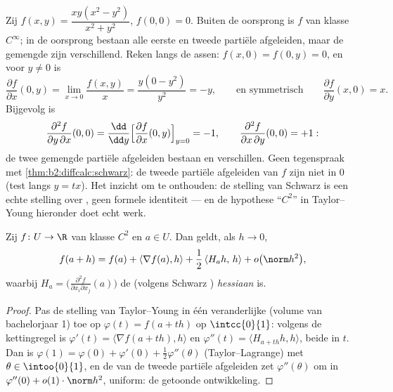 \begin{example}\label{ex:b2:diffcalc:peano}
Zij $f(x, y) = \dfrac{xy(x^2 - y^2)}{x^2 + y^2}$, $f(0,0) = 0$.
Buiten de oorsprong is $f$ van klasse $C^\infty$; in de oorsprong
bestaan alle eerste en tweede partiële afgeleiden, maar de gemengde
zijn verschillend. Reken langs de assen: $f(x, 0) = f(0, y) = 0$,
en voor $y \neq 0$ is
\[
\frac{\partial f}{\partial x}(0, y)
= \lim_{x\to0}\frac{f(x,y)}{x}
= \frac{y(0 - y^2)}{y^2} = -y ,
\qquad\text{en symmetrisch}\qquad
\frac{\partial f}{\partial y}(x, 0) = x .
\]
Bijgevolg is
\[
\frac{\partial^2 f}{\partial y\,\partial x}(0,0)
= \frac{\dd}{\dd y}\Bigl[\frac{\partial f}{\partial
x}(0,y)\Bigr]_{y=0} = -1,
\qquad
\frac{\partial^2 f}{\partial x\,\partial y}(0,0) = +1 :
\]
de twee gemengde partiële afgeleiden bestaan en verschillen. Geen
tegenspraak met \cref{thm:b2:diffcalc:schwarz}: de tweede partiële
afgeleiden van $f$ zijn niet  in $0$ (test langs $y = tx$).
Het inzicht om te onthouden: de stelling van Schwarz is een echte
stelling over \emph{}, geen formele identiteit --- en
de hypothese ``$C^2$'' in Taylor--Young hieronder doet echt werk.
\end{example}

\begin{theorem}\label{thm:b2:diffcalc:taylor}
Zij $f \colon U \to \R$ van klasse $C^2$ en $a \in U$. Dan geldt,
als $h \to 0$,
\[
f(a + h) = f(a) + \langle\nabla f(a), h\rangle
+ \frac12\, \langle H_a h,\, h\rangle + o\bigl(\norm h^2\bigr),
\]
waarbij $H_a = \bigl(\frac{\partial^2 f}{\partial x_i\partial
x_j}(a)\bigr)$ de (volgens Schwarz )
\emph{hessiaan} is.
\end{theorem}

\begin{proof}
Pas de stelling van Taylor--Young in één veranderlijke (volume van
bachelorjaar 1) toe op $\varphi(t) = f(a + th)$ op $\intcc{0}{1}$:
volgens de kettingregel is $\varphi'(t) = \langle \nabla f(a + th),
h\rangle$ en $\varphi''(t) = \langle H_{a+th}h, h\rangle$, beide
 in $t$. Dan is $\varphi(1) = \varphi(0) + \varphi'(0) +
\frac12\varphi''(\theta)$ (Taylor--Lagrange) met $\theta \in
\intoo{0}{1}$, en de  van de tweede partiële
afgeleiden zet $\varphi''(\theta)$ om in $\varphi''(0) +
o(1)\cdot\norm h^2$, uniform: de getoonde ontwikkeling.
\end{proof}

